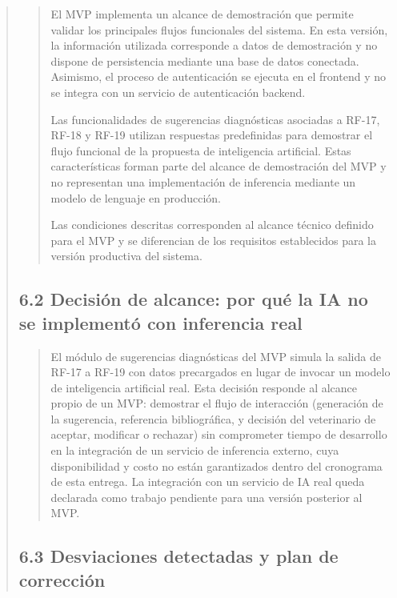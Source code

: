 \documentclass[
]{article}
\begin{document}
\begin{quote}
\begin{quote}
El MVP implementa un alcance de demostración que permite validar los principales flujos funcionales del sistema. En esta versión, la información utilizada corresponde a datos de demostración y no dispone de persistencia mediante una base de datos conectada. Asimismo, el proceso de autenticación se ejecuta en el frontend y no se integra con un servicio de autenticación backend.

Las funcionalidades de sugerencias diagnósticas asociadas a RF-17, RF-18 y RF-19 utilizan respuestas predefinidas para demostrar el flujo funcional de la propuesta de inteligencia artificial. Estas características forman parte del alcance de demostración del MVP y no representan una implementación de inferencia mediante un modelo de lenguaje en producción.

Las condiciones descritas corresponden al alcance técnico definido para el MVP y se diferencian de los requisitos establecidos para la versión productiva del sistema.
\end{quote}


\subsection{6.2 Decisión de alcance: por qué la IA no se implementó
con inferencia real}\label{s6-2-decision-de-alcance}

\begin{quote}
El módulo de sugerencias diagnósticas del MVP simula la salida de RF-17
a RF-19 con datos precargados en lugar de invocar un modelo de
inteligencia artificial real. Esta decisión responde al alcance propio
de un MVP: demostrar el flujo de interacción (generación de la
sugerencia, referencia bibliográfica, y decisión del veterinario de
aceptar, modificar o rechazar) sin comprometer tiempo de desarrollo en
la integración de un servicio de inferencia externo, cuya
disponibilidad y costo no están garantizados dentro del cronograma de
esta entrega. La integración con un servicio de IA real queda declarada
como trabajo pendiente para una versión posterior al MVP.
\end{quote}

\subsection{6.3 Desviaciones detectadas y plan de
corrección}\label{s6-3-desviaciones-detectadas}


\end{quote}
\end{document}
